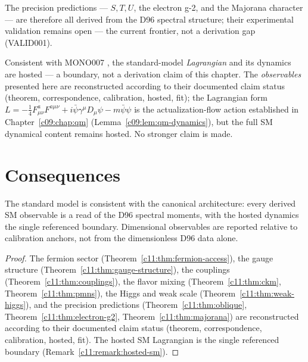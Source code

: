 The precision predictions --- $S,T,U$, the electron g-2, and the Majorana character ---
are therefore all derived from the D96 spectral structure; their experimental validation
remains open --- the current frontier, not a derivation gap (VALID001).

\begin{remark}
\label{c11:remark:hosted-sm}
Consistent with MONO007 \cite{c11:MONO007}, the standard-model \emph{Lagrangian} and its
dynamics are hosted --- a boundary, not a derivation claim of this chapter. The
\emph{observables} presented here are reconstructed according to their documented claim
status (theorem, correspondence, calibration, hosted, fit); the Lagrangian form
$L = -\frac{1}{4}F^a_{\mu\nu}F^{a\mu\nu} + i\bar{\psi}\gamma^\mu D_\mu\psi - m\bar{\psi}\psi$
is the actualization-flow action established in Chapter~\ref{c09:chap:qm}
(Lemma~\ref{c09:lem:qm-dynamics}), but the full SM dynamical content remains hosted. No stronger
claim is made.
\end{remark}

\section{Consequences}
\label{c11:sec:sm-consequences}

\begin{theorem}
\label{c11:thm:sm-consistent}
The standard model is consistent with the canonical architecture: every derived SM
observable is a read of the D96 spectral moments, with the hosted dynamics the single
referenced boundary. Dimensional observables are reported relative to calibration anchors,
not from the dimensionless D96 data alone.
\end{theorem}

\begin{proof}
The fermion sector (Theorem~\ref{c11:thm:fermion-access}), the gauge structure
(Theorem~\ref{c11:thm:gauge-structure}), the couplings (Theorem~\ref{c11:thm:couplings}), the flavor
mixing (Theorem~\ref{c11:thm:ckm}, Theorem~\ref{c11:thm:pmns}), the Higgs and weak scale
(Theorem~\ref{c11:thm:weak-higgs}), and the precision predictions
(Theorem~\ref{c11:thm:oblique}, Theorem~\ref{c11:thm:electron-g2}, Theorem~\ref{c11:thm:majorana})
are reconstructed according to their documented claim status (theorem, correspondence,
calibration, hosted, fit). The hosted SM Lagrangian is the single referenced
boundary (Remark~\ref{c11:remark:hosted-sm}).
\end{proof}


